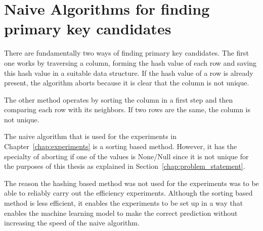 \section{Naive Algorithms for finding primary key candidates}
There are fundamentally two ways of finding primary key candidates. The first one works by traversing a column, forming the hash value of each row and saving this hash value in a suitable data structure. If the hash value of a row is already present, the algorithm aborts because it is clear that the column is not unique.

The other method operates by sorting the column in a first step and then comparing each row with its neighbors. If two rows are the same, the column is not unique.

The naive algorithm that is used for the experiments in Chapter~\ref{chap:experiments} is a sorting based method. However, it has the specialty of aborting if one of the values is None/Null since it is not unique for the purposes of this thesis as explained in Section~\ref{chap:problem_statement}.

The reason the hashing based method was not used for the experiments was to be able to reliably carry out the efficiency experiments. Although the sorting based method is less efficient, it enables the experiments to be set up in a way that enables the machine learning model to make the correct prediction without increasing the speed of the naive algorithm.
